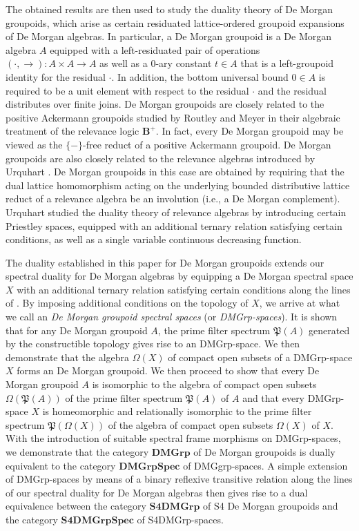 \documentclass{amsart}
\theoremstyle{plain}
\theoremstyle{definition}
\begin{document}
The obtained results are then used to study the duality theory of De Morgan groupoids, which arise as certain residuated lattice-ordered groupoid expansions of De Morgan algebras. In particular, a De Morgan groupoid is a De Morgan algebra $A$ equipped with a left-residuated pair of operations $(\cdot,\rightarrow)\colon A\times A\to A$ as well as a $0$-ary constant $t\in A$ that is a left-groupoid identity for the residual $\cdot$. In addition, the bottom universal bound $0\in A$ is required to be a unit element with respect to the residual $\cdot$ and the residual distributes over finite joins. De Morgan groupoids are closely related to the positive Ackermann groupoids studied by Routley and Meyer \cite{meyer} in their algebraic treatment of the relevance logic $\mathbf{B}^+$. In fact, every De Morgan groupoid may be viewed as the $\{-\}$-free reduct of a positive Ackermann groupoid. De Morgan groupoids are also closely related to the relevance algebras introduced by Urquhart \cite{urq}. De Morgan groupoids in this case are obtained by requiring that the dual lattice homomorphism acting on the underlying bounded distributive lattice reduct of a relevance algebra be an involution (i.e., a De Morgan complement). Urquhart studied the duality theory of relevance algebras by introducing certain Priestley spaces, equipped with an additional ternary relation satisfying certain conditions, as well as a single variable continuous decreasing function.


The duality established in this paper for De Morgan groupoids extends our spectral duality for De Morgan algebras by equipping a De Morgan spectral space $X$ with an additional ternary relation satisfying certain conditions along the lines of \cite{urq}. By imposing additional conditions on the topology of $X$, we arrive at what we call an \emph{De Morgan groupoid spectral spaces} (or \emph{DMGrp-spaces}). It is shown that for any De Morgan groupoid $A$, the prime filter spectrum $\mathfrak{P}(A)$ generated by the constructible topology gives rise to an DMGrp-space. We then demonstrate that the algebra $\Omega(X)$ of compact open subsets of a DMGrp-space $X$ forms an De Morgan groupoid. We then proceed to show that every De Morgan groupoid $A$ is isomorphic to the algebra of compact open subsets $\Omega(\mathfrak{P}(A))$ of the prime filter spectrum $\mathfrak{P}(A)$ of $A$ and that every DMGrp-space $X$ is homeomorphic and relationally isomorphic to the prime filter spectrum $\mathfrak{P}(\Omega(X))$ of the algebra of compact open subsets $\Omega(X)$ of $X$. With the introduction of suitable spectral frame morphisms on DMGrp-spaces, we demonstrate that the category $\mathbf{DMGrp}$ of De Morgan groupoids is dually equivalent to the category $\mathbf{DMGrpSpec}$ of DMGgrp-spaces. A simple extension of DMGrp-spaces by means of a binary reflexive transitive relation along the lines of our spectral duality for De Morgan algebras then gives rise to a dual equivalence between the category $\mathbf{S4DMGrp}$ of S4 De Morgan groupoids and the category $\mathbf{S4DMGrpSpec}$ of S4DMGrp-spaces.    
 
\end{document}
